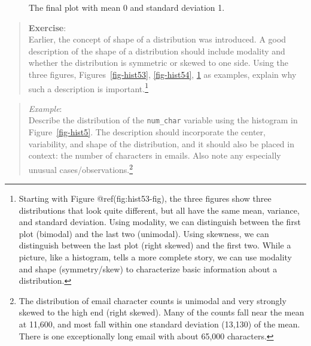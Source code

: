 \documentclass[
  letterpaper,
  DIV=11,
  numbers=noendperiod]{scrreprt}
\begin{document}
\begin{figure}


\caption{\label{fig-hist55}The final plot with mean 0 and standard
deviation 1.}

\end{figure}%

\begin{quote}
\textbf{Exercise}:\\
Earlier, the concept of shape of a distribution was introduced. A good
description of the shape of a distribution should include modality and
whether the distribution is symmetric or skewed to one side. Using the
three figures,
Figures~\ref{fig-hist53}, \ref{fig-hist54}, \ref{fig-hist55} as
examples, explain why such a description is important.\footnote{Starting
  with Figure @ref(fig:hist53-fig), the three figures show three
  distributions that look quite different, but all have the same mean,
  variance, and standard deviation. Using modality, we can distinguish
  between the first plot (bimodal) and the last two (unimodal). Using
  skewness, we can distinguish between the last plot (right skewed) and
  the first two. While a picture, like a histogram, tells a more
  complete story, we can use modality and shape (symmetry/skew) to
  characterize basic information about a distribution.}
\end{quote}

\begin{quote}
\emph{Example}:\\
Describe the distribution of the \texttt{num\_char} variable using the
histogram in Figure~\ref{fig-hist5}. The description should incorporate
the center, variability, and shape of the distribution, and it should
also be placed in context: the number of characters in emails. Also note
any especially unusual cases/observations.\footnote{The distribution of
  email character counts is unimodal and very strongly skewed to the
  high end (right skewed). Many of the counts fall near the mean at
  11,600, and most fall within one standard deviation (13,130) of the
  mean. There is one exceptionally long email with about 65,000
  characters.}
\end{quote}
\end{document}

